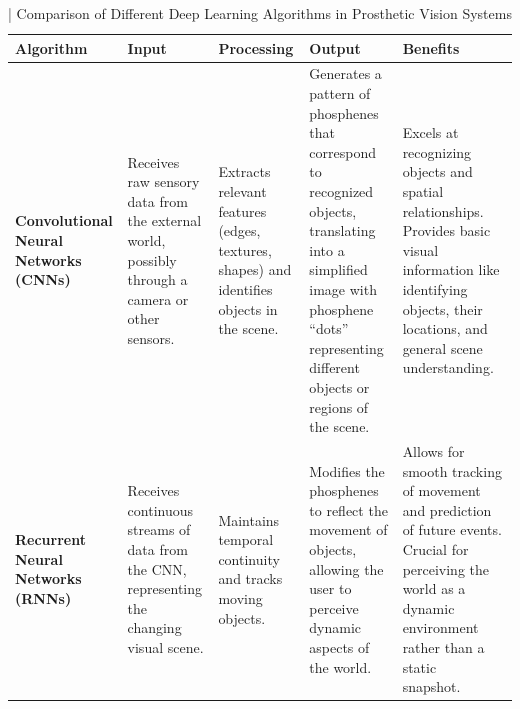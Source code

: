 \documentclass[twocolumn,10pt]{article}
\begin{document}
\begin{table}[ht!]
      \centering
      \fontsize{8pt}{10pt}\selectfont
      \caption{| Comparison of Different Deep Learning Algorithms in Prosthetic Vision Systems}\label{tab:dl_algorithms_prosthetic_vision}
      \begin{tabularx}{\textwidth}{|X|X|X|X|X|}
            \hline
            \textbf{Algorithm}                                                                                                                                                                           & \textbf{Input} & \textbf{Processing} & \textbf{Output} & \textbf{Benefits} \\ \hline

            \textbf{Convolutional Neural Networks (CNNs)}                                                                                                                                                &
            Receives raw sensory data from the external world, possibly through a camera or other sensors.                                                                                               &
            Extracts relevant features (edges, textures, shapes) and identifies objects in the scene.                                                                                                    &
            Generates a pattern of phosphenes that correspond to recognized objects, translating into a simplified image with phosphene ``dots'' representing different objects or regions of the scene. &
            Excels at recognizing objects and spatial relationships. Provides
            basic visual information like identifying objects, their locations,
            and general scene understanding.\
            \\ \hline

            \textbf{Recurrent Neural Networks (RNNs)}                                                                                                                                                    &
            Receives continuous streams of data from the CNN, representing the changing visual scene.                                                                                                    &
            Maintains temporal continuity and tracks moving objects.                                                                                                                                     &
            Modifies the phosphenes to reflect the movement of objects, allowing the user to perceive dynamic aspects of the world.                                                                      &
            Allows for smooth tracking of movement and prediction of future
            events. Crucial for perceiving the world as a dynamic environment
            rather than a static snapshot.\
            \\ \hline


\end{tabularx}
\end{table}
\end{document}
